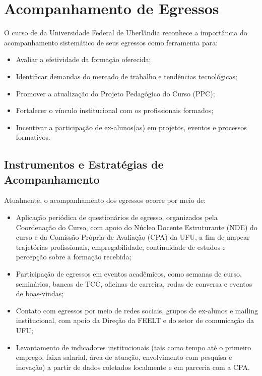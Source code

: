 \chapter{Acompanhamento de Egressos}

O curso de \ppccurso da Universidade Federal de Uberlândia reconhece a importância do acompanhamento sistemático de seus egressos como ferramenta para:

\begin{itemize}
    \item Avaliar a efetividade da formação oferecida;
    \item Identificar demandas do mercado de trabalho e tendências tecnológicas;
    \item Promover a atualização do Projeto Pedagógico do Curso (PPC);
    \item Fortalecer o vínculo institucional com os profissionais formados;
    \item Incentivar a participação de ex-alunos(as) em projetos, eventos e processos formativos.
\end{itemize}

\section{Instrumentos e Estratégias de Acompanhamento}

Atualmente, o acompanhamento dos egressos ocorre por meio de:

\begin{itemize}
    \item Aplicação periódica de questionários de egresso, organizados pela Coordenação do Curso, com apoio do Núcleo Docente Estruturante (NDE) do curso e da Comissão Própria de Avaliação (CPA) da UFU, a fim de mapear trajetórias profissionais, empregabilidade, continuidade de estudos e percepção sobre a formação recebida;
    \item Participação de egressos em eventos acadêmicos, como semanas de curso, seminários, bancas de TCC, oficinas de carreira, rodas de conversa e eventos de boas-vindas;
    \item Contato com egressos por meio de redes sociais, grupos de ex-alunos e mailing institucional, com apoio da Direção da FEELT e do setor de comunicação da UFU;
    \item Levantamento de indicadores institucionais (tais como tempo até o primeiro emprego, faixa salarial, área de atuação, envolvimento com pesquisa e inovação) a partir de dados coletados localmente e em parceria com a CPA.
\end{itemize}
    
